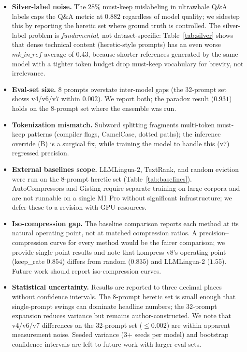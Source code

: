 \begin{itemize}
  \item \textbf{Silver-label noise.} The 28\% must-keep mislabeling in
        ultrawhale Q\&A labels caps the Q\&A metric at $0.882$ regardless of
        model quality; we sidestep this by reporting the heretic set where
        ground truth is controlled. The silver-label problem is
        \emph{fundamental}, not dataset-specific: Table~\ref{tab:silver}
        shows that dense technical content (heretic-style prompts) has an
        even worse $\mathit{mk\_in\_ref}$ average of $0.43$, because shorter
        references generated by the same model with a tighter token budget
        drop must-keep vocabulary for brevity, not irrelevance.

  \item \textbf{Eval-set size.} 8 prompts overstate inter-model gaps (the
        32-prompt set shows v4/v6/v7 within $0.002$). We report both; the
        paradox result ($0.931$) holds on the 8-prompt set where the
        ensemble was run.
  \item \textbf{Tokenization mismatch.} Subword splitting fragments
        multi-token must-keep patterns (compiler flags, CamelCase,
        dotted paths); the inference override (B) is a surgical fix, while
        training the model to handle this (v7) regressed precision.
  \item \textbf{External baselines scope.} LLMLingua-2, TextRank, and random
        eviction were run on the 8-prompt heretic set (Table~\ref{tab:baselines}).
        AutoCompressors and Gisting require separate training on large corpora
        and are not runnable on a single M1 Pro without significant
        infrastructure; we defer these to a revision with GPU resources.
  \item \textbf{Iso-compression gap.} The baseline comparison reports each
        method at its natural operating point, not at matched compression
        ratios. A precision--compression curve for every method would be the
        fairer comparison; we provide single-point results and note that
        kompress-v8's operating point (keep\_rate $0.854$) differs from
        random ($0.835$) and LLMLingua-2 ($1.55$). Future work should
        report iso-compression curves.
  \item \textbf{Statistical uncertainty.} Results are reported to three
        decimal places without confidence intervals. The 8-prompt heretic
        set is small enough that single-prompt swings can dominate headline
        numbers; the 32-prompt expansion reduces variance but remains
        author-constructed. We note that v4/v6/v7 differences on the
        32-prompt set (${\le}0.002$) are within apparent measurement noise.
        Seeded variance (3+ seeds per model) and bootstrap confidence
        intervals are left to future work with larger eval sets.
\end{itemize}

